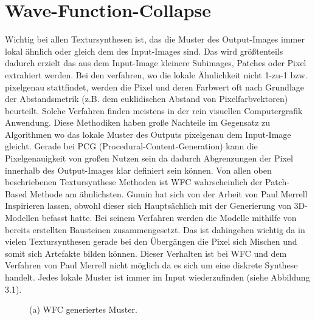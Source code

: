 \documentclass[12pt, a4paper,twoside,openright]{report}
\begin{document}
\chapter{Wave-Function-Collapse}

Wichtig bei allen Textursynthesen ist,
das die Muster des Output-Images immer lokal ähnlich oder gleich dem des Input-Images sind.
Das wird größtenteils dadurch erzielt das aus dem Input-Image kleinere Subimages, Patches oder Pixel extrahiert werden.
Bei den verfahren, wo die lokale Ähnlichkeit nicht 1-zu-1 bzw. pixelgenau stattfindet,
werden die Pixel und deren Farbwert oft nach Grundlage der Abstandsmetrik {(z.B. dem euklidischen Abstand von Pixelfarbvektoren)} beurteilt.
Solche Verfahren finden meistens in der rein visuellen Computergrafik Anwendung.
Diese Methodiken haben große Nachteile im Gegensatz zu Algorithmen wo das lokale Muster des Outputs pixelgenau dem Input-Image gleicht.
Gerade bei PCG {(Procedural-Content-Generation)} kann die Pixelgenauigkeit von großen Nutzen sein da dadurch Abgrenzungen der Pixel innerhalb des Output-Images klar definiert sein können.
\cite{Karth2017WaveFunctionCollapseIC}
Von allen oben beschriebenen Textursynthese Methoden ist WFC wahrscheinlich der Patch-Based Methode am ähnlichsten.
\newline
Gumin hat sich von der Arbeit von Paul Merrell Inspirieren lassen, obwohl dieser sich Hauptsächlich mit der Generierung von 3D-Modellen befasst hatte.
Bei seinem Verfahren werden die Modelle mithilfe von bereits erstellten Bausteinen zusammengesetzt.
Das ist dahingehen wichtig da in vielen Textursynthesen gerade bei den Übergängen die Pixel sich Mischen und somit sich Artefakte bilden können.
Dieser Verhalten ist bei WFC und dem Verfahren von Paul Merrell nicht möglich da es sich um eine diskrete Synthese handelt.
Jedes lokale Muster ist immer im Input wiederzufinden {(siehe Abbildung 3.1)}. \cite{Karth2017WaveFunctionCollapseIC, merrell2009model, Gumin_Wave_Function_Collapse_2016}

\begin{figure}[H]
    \centering
    \caption{(a) WFC generiertes Muster.}%
\end{figure}
\end{document}
